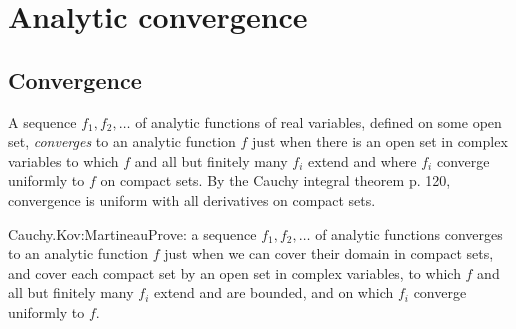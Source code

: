 \chapter{Analytic convergence}
\section{Convergence}\label{section:convergence}
A sequence \(f_1,f_2,\dots\) of analytic functions of real variables, defined on some open set, \emph{converges} to an analytic function \(f\) just when there is an open set in complex variables to which \(f\) and all but finitely many \(f_i\) extend and where \(f_i\) converge uniformly to \(f\) on compact sets.
By the Cauchy integral theorem \cite{Ahlfors:1978} p. 120, convergence is uniform with all derivatives on compact sets.
\begin{problem}{Cauchy.Kov:Martineau}Prove: a sequence \(f_1,f_2,\dots\) of analytic functions converges to an analytic function \(f\) just when we can cover their domain in compact sets, and cover each compact set by an open set in complex variables, to which \(f\) and all but finitely many \(f_i\) extend and are bounded, and on which \(f_i\) converge uniformly to \(f\).
\end{problem}

